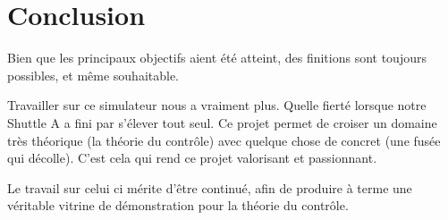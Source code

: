 \documentclass[a4paper,11pt]{article}
\begin{document}
\section{Conclusion}
    Bien que les principaux objectifs aient été atteint, des finitions sont toujours possibles, et même souhaitable.
        
    Travailler sur ce simulateur nous a vraiment plus. Quelle fierté lorsque notre Shuttle A a fini par s'élever tout seul. 
    Ce projet permet de croiser un domaine très théorique (la théorie du contrôle) avec quelque chose de concret (une fusée qui décolle). C'est cela qui rend ce projet valorisant et passionnant.
    
    Le travail sur celui ci mérite d'être continué, afin de produire à terme une véritable vitrine de démonstration pour la théorie du contrôle.
\end{document}
